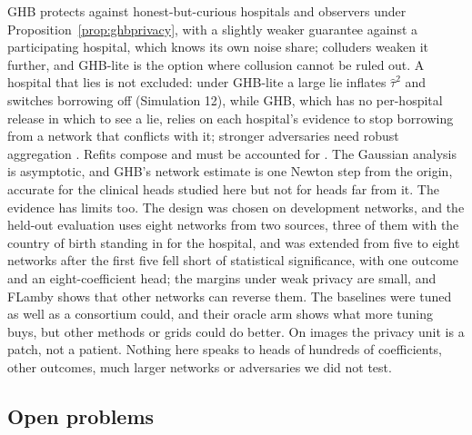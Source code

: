 \documentclass[acmsmall,screen,review]{acmart}
\theoremstyle{acmdefinition}
\begin{document}
GHB protects against honest-but-curious hospitals and observers under Proposition~\ref{prop:ghbprivacy}, with a slightly weaker guarantee against a participating hospital, which knows its own noise share; colluders weaken it further, and GHB-lite is the option where collusion cannot be ruled out. A hospital that lies is not excluded: under GHB-lite a large lie inflates $\hat{\tau}^2$ and switches borrowing off (Simulation 12), while GHB, which has no per-hospital release in which to see a lie, relies on each hospital's evidence to stop borrowing from a network that conflicts with it; stronger adversaries need robust aggregation \cite{blanchard2017machine}. Refits compose and must be accounted for \cite{bun2016concentrated,mironov2017renyi}. The Gaussian analysis is asymptotic, and GHB's network estimate is one Newton step from the origin, accurate for the clinical heads studied here but not for heads far from it. The evidence has limits too. The design was chosen on development networks, and the held-out evaluation uses eight networks from two sources, three of them with the country of birth standing in for the hospital, and was extended from five to eight networks after the first five fell short of statistical significance, with one outcome and an eight-coefficient head; the margins under weak privacy are small, and FLamby shows that other networks can reverse them. The baselines were tuned as well as a consortium could, and their oracle arm shows what more tuning buys, but other methods or grids could do better. On images the privacy unit is a patch, not a patient. Nothing here speaks to heads of hundreds of coefficients, other outcomes, much larger networks or adversaries we did not test.

\subsection{Open problems}\label{sec:open}
\end{document}
